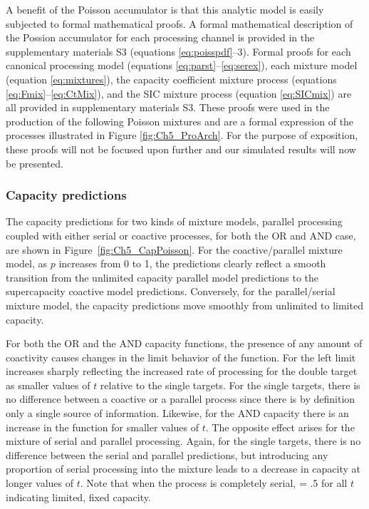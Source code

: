 A benefit of the Poisson accumulator is that this analytic model is easily subjected to formal mathematical proofs. A formal mathematical description of the Possion accumulator for each processing channel is provided in the supplementary materials S3 (equations \ref{eq:poisspdf}--3). Formal proofs for each canonical processing model (equations \ref{eq:parst}--\ref{eq:serex}), each mixture model (equation \ref{eq:mixtures}), the capacity coefficient mixture process (equations \ref{eq:Fmix}--\ref{eq:CtMix}), and the SIC mixture process (equation \ref{eq:SICmix}) are all provided in supplementary materials S3. These proofs were used in the production of the following Poisson mixtures and are a formal expression of the processes illustrated in Figure \ref{fig:Ch5_ProArch}. For the purpose of exposition, these proofs will not be focused upon further and our simulated results will now be presented.

\subsubsection{Capacity predictions} 
The capacity predictions for two kinds of mixture models, parallel processing coupled with either serial or coactive processes, for both the OR and AND case, are shown in Figure~\ref{fig:Ch5_CapPoisson}. For the coactive/parallel mixture model, as $p$ increases from 0 to 1, the predictions clearly reflect a smooth transition from the unlimited capacity parallel model predictions to the supercapacity coactive model predictions. Conversely, for the parallel/serial mixture model, the capacity predictions move smoothly from unlimited to limited capacity. 

For both the OR and the AND capacity functions, the presence of any amount of coactivity causes changes in the limit behavior of the function. For \Cor the left limit increases sharply reflecting the increased rate of processing for the double target as smaller values of $t$ relative to the single targets. For the single targets, there is no difference between a coactive or a parallel process since there is by definition only a single source of information. Likewise, for the AND capacity there is an increase in the \Cand function for smaller values of $t$. The opposite effect arises for the mixture of serial and parallel processing. Again, for the single targets, there is no difference between the serial and parallel predictions, but introducing any proportion of serial processing into the mixture leads to a decrease in capacity at longer values of $t$. Note that when the process is completely serial, \Cor = .5 for all $t$ indicating limited, fixed capacity. 
 
